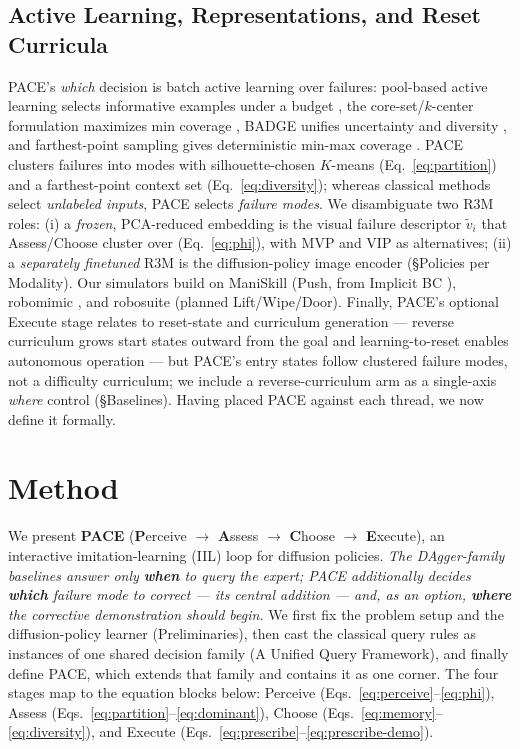 \documentclass[letterpaper]{article} %
\begin{document}
\subsection{Active Learning, Representations, and Reset Curricula}
PACE's \emph{which} decision is batch active learning over failures: pool-based
active learning selects informative examples under a budget \cite{settles2009active},
the core-set/$k$-center formulation maximizes min coverage \cite{sener2018coreset},
BADGE unifies uncertainty and diversity \cite{ash2020badge}, and farthest-point
sampling gives deterministic min-max coverage \cite{eldar1997fps}. PACE clusters
failures into modes with silhouette-chosen $K$-means \cite{lloyd1982kmeans}
(Eq.~\eqref{eq:partition}) and a farthest-point context set (Eq.~\eqref{eq:diversity});
whereas classical methods select \emph{unlabeled inputs}, PACE selects \emph{failure
modes}. We disambiguate two R3M roles: (i) a \emph{frozen}, PCA-reduced embedding
\cite{nair2022r3m} is the visual failure descriptor $\tilde v_i$ that Assess/Choose
cluster over (Eq.~\eqref{eq:phi}), with MVP \cite{radosavovic2022mvp} and VIP
\cite{ma2023vip} as alternatives; (ii) a \emph{separately finetuned} R3M is the
diffusion-policy image encoder (\S Policies per Modality). Our simulators build on
ManiSkill
\cite{mu2021maniskill,gu2023maniskill2,tao2024maniskill3} (Push, from Implicit BC
\cite{florence2021implicitbc}), robomimic \cite{mandlekar2021robomimic}, and
robosuite \cite{zhu2020robosuite} (planned Lift/Wipe/Door). Finally, PACE's optional
Execute stage relates to reset-state and curriculum generation --- reverse
curriculum grows start states outward from the goal
\cite{florensa2017reversecurriculum} and learning-to-reset enables autonomous
operation \cite{eysenbach2018leavenotrace} --- but PACE's entry states follow
clustered failure modes, not a difficulty curriculum; we include a reverse-curriculum
arm as a single-axis \emph{where} control (\S Baselines). Having placed PACE against
each thread, we now define it formally.

\section{Method}
\label{sec:method}

We present \textbf{PACE} (\textbf{P}erceive $\rightarrow$ \textbf{A}ssess
$\rightarrow$ \textbf{C}hoose $\rightarrow$ \textbf{E}xecute), an interactive
imitation-learning (IIL) loop for diffusion policies. \emph{The DAgger-family
baselines answer only \textbf{when} to query the expert; PACE additionally
decides \textbf{which} failure mode to correct --- its central addition --- and,
as an option, \textbf{where} the corrective demonstration should begin.} We first
fix the problem setup and the diffusion-policy learner (Preliminaries), then cast
the classical query rules as instances of one shared decision family (A Unified
Query Framework), and finally define PACE, which extends that family and contains
it as one corner. The four stages map to the equation blocks below: Perceive
(Eqs.~\ref{eq:perceive}--\ref{eq:phi}), Assess
(Eqs.~\ref{eq:partition}--\ref{eq:dominant}), Choose
(Eqs.~\ref{eq:memory}--\ref{eq:diversity}), and Execute
(Eqs.~\ref{eq:prescribe}--\ref{eq:prescribe-demo}).
\end{document}

